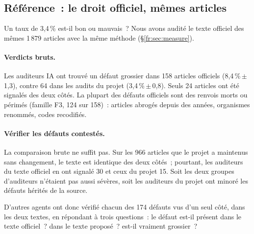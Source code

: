 \documentclass[11pt,a4paper]{article}
\begin{document}
\subsection{Référence~: le droit officiel, mêmes articles}
\label{fr:sec:baseline}

Un taux de 3,4\,\% est-il bon ou mauvais~? Nous avons audité le texte officiel des mêmes 1\,879 articles avec la même méthode (\S\ref{fr:sec:measure}).

\paragraph{Verdicts bruts.}
Les auditeurs IA ont trouvé un défaut grossier dans 158 articles officiels (8,4\,\%\,$\pm$\,1,3), contre 64 dans les audits du projet (3,4\,\%\,$\pm$\,0,8). Seuls 24 articles ont été signalés des deux côtés. La plupart des défauts officiels sont des renvois morts ou périmés (famille F3, 124 sur 158)~: articles abrogés depuis des années, organismes renommés, codes recodifiés.

\paragraph{Vérifier les défauts contestés.}
La comparaison brute ne suffit pas. Sur les 966 articles que le projet a maintenus sans changement, le texte est identique des deux côtés~; pourtant, les auditeurs du texte officiel en ont signalé 30 et ceux du projet 15. Soit les deux groupes d'auditeurs n'étaient pas aussi sévères, soit les auditeurs du projet ont minoré les défauts hérités de la source.

D'autres agents ont donc vérifié chacun des 174 défauts vus d'un seul côté, dans les deux textes, en répondant à trois questions~: le défaut est-il présent dans le texte officiel~? dans le texte proposé~? est-il vraiment grossier~?
\end{document}
